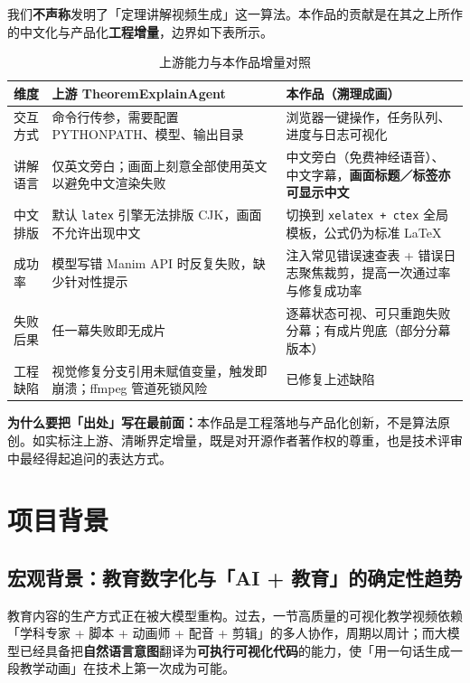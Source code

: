 \documentclass[11pt,a4paper]{ctexart}
\begin{document}
我们\textbf{不声称}发明了「定理讲解视频生成」这一算法。本作品的贡献是在其之上所作的中文化与产品化\textbf{工程增量}，边界如下表所示。

\begin{table}[htbp]
\centering
\small
\caption{上游能力与本作品增量对照}
\begin{tabularx}{\textwidth}{@{}p{2.5cm} p{4.9cm} X@{}}
\toprule
\textbf{维度} & \textbf{上游 TheoremExplainAgent} & \textbf{本作品（溯理成画）} \\
\midrule
交互方式 & 命令行传参，需要配置 PYTHONPATH、模型、输出目录 & 浏览器一键操作，任务队列、进度与日志可视化 \\
讲解语言 & 仅英文旁白；画面上刻意全部使用英文以避免中文渲染失败 & 中文旁白（免费神经语音）、中文字幕，\textbf{画面标题／标签亦可显示中文} \\
中文排版 & 默认 \texttt{latex} 引擎无法排版 CJK，画面不允许出现中文 & 切换到 \texttt{xelatex + ctex} 全局模板，公式仍为标准 LaTeX \\
成功率 & 模型写错 Manim API 时反复失败，缺少针对性提示 & 注入常见错误速查表 + 错误日志聚焦裁剪，提高一次通过率与修复成功率 \\
失败后果 & 任一幕失败即无成片 & 逐幕状态可视、可只重跑失败分幕；有成片兜底（部分分幕版本） \\
工程缺陷 & 视觉修复分支引用未赋值变量，触发即崩溃；ffmpeg 管道死锁风险 & 已修复上述缺陷 \\
\bottomrule
\end{tabularx}
\end{table}

\begin{keybox}
\textbf{为什么要把「出处」写在最前面：}本作品是工程落地与产品化创新，不是算法原创。如实标注上游、清晰界定增量，既是对开源作者著作权的尊重，也是技术评审中最经得起追问的表达方式。
\end{keybox}

\section{项目背景}

\subsection{宏观背景：教育数字化与「AI + 教育」的确定性趋势}

教育内容的生产方式正在被大模型重构。过去，一节高质量的可视化教学视频依赖「学科专家 + 脚本 + 动画师 + 配音 + 剪辑」的多人协作，周期以周计；而大模型已经具备把\textbf{自然语言意图}翻译为\textbf{可执行可视化代码}的能力，使「用一句话生成一段教学动画」在技术上第一次成为可能。
\end{document}
